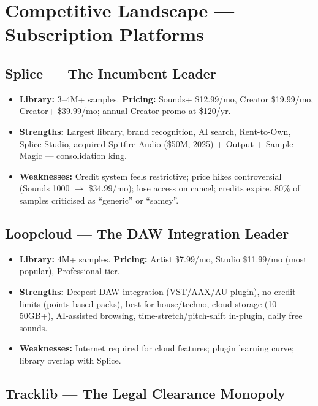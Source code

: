 \documentclass[11pt,a4paper]{article}
\begin{document}

\section{Competitive Landscape — Subscription Platforms}

\subsection{Splice — The Incumbent Leader}

\begin{itemize}
  \item \textbf{Library:} 3--4M+ samples. \textbf{Pricing:} Sounds+ \$12.99/mo, Creator \$19.99/mo,
        Creator+ \$39.99/mo; annual Creator promo at \$120/yr.
  \item \textbf{Strengths:} Largest library, brand recognition, AI search, Rent-to-Own, Splice
        Studio, acquired Spitfire Audio (\$50M, 2025) + Output + Sample Magic — consolidation king.
  \item \textbf{Weaknesses:} Credit system feels restrictive; price hikes controversial
        (Sounds 1000 $\rightarrow$ \$34.99/mo); lose access on cancel; credits expire. 80\% of samples
        criticised as ``generic'' or ``samey''.
\end{itemize}

\subsection{Loopcloud — The DAW Integration Leader}

\begin{itemize}
  \item \textbf{Library:} 4M+ samples. \textbf{Pricing:} Artist \$7.99/mo, Studio \$11.99/mo
        (most popular), Professional tier.
  \item \textbf{Strengths:} Deepest DAW integration (VST/AAX/AU plugin), no credit limits
        (points-based packs), best for house/techno, cloud storage (10--50GB+), AI-assisted
        browsing, time-stretch/pitch-shift in-plugin, daily free sounds.
  \item \textbf{Weaknesses:} Internet required for cloud features; plugin learning curve;
        library overlap with Splice.
\end{itemize}

\subsection{Tracklib — The Legal Clearance Monopoly}
\end{document}
